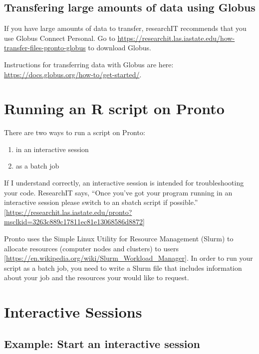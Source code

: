 \documentclass[
]{book}
\providecommand{\tightlist}{%
  \setlength{\itemsep}{0pt}\setlength{\parskip}{0pt}}
\begin{document}
\hypertarget{transfering-large-amounts-of-data-using-globus}{%
\subsection{Transfering large amounts of data using Globus}\label{transfering-large-amounts-of-data-using-globus}}

If you have large amounts of data to transfer, researchIT recommends that you use Globus Connect Personal. Go to \url{https://researchit.las.iastate.edu/how-transfer-files-pronto-globus} to download Globus.

Instructions for transferring data with Globus are here: \url{https://docs.globus.org/how-to/get-started/}.

\hypertarget{running-an-r-script-on-pronto}{%
\section{Running an R script on Pronto}\label{running-an-r-script-on-pronto}}

There are two ways to run a script on Pronto:

\begin{enumerate}
\def\labelenumi{\arabic{enumi}.}
\tightlist
\item
  in an interactive session
\item
  as a batch job
\end{enumerate}

If I understand correctly, an interactive session is intended for troubleshooting your code. ResearchIT says, ``Once you've got your program running in an interactive session please switch to an sbatch script if possible.'' {[}\url{https://researchit.las.iastate.edu/pronto?msclkid=3263c889c17811ec81e13068586d8872}{]}

Pronto uses the Simple Linux Utility for Resource Management (Slurm) to allocate resources (computer nodes and clusters) to users {[}\url{https://en.wikipedia.org/wiki/Slurm_Workload_Manager}{]}. In order to run your script as a batch job, you need to write a Slurm file that includes information about your job and the resources your would like to request.

\hypertarget{interactive-sessions}{%
\section{Interactive Sessions}\label{interactive-sessions}}

\hypertarget{ex-start-interactive}{%
\subsection{Example: Start an interactive session}\label{ex-start-interactive}}
\end{document}
